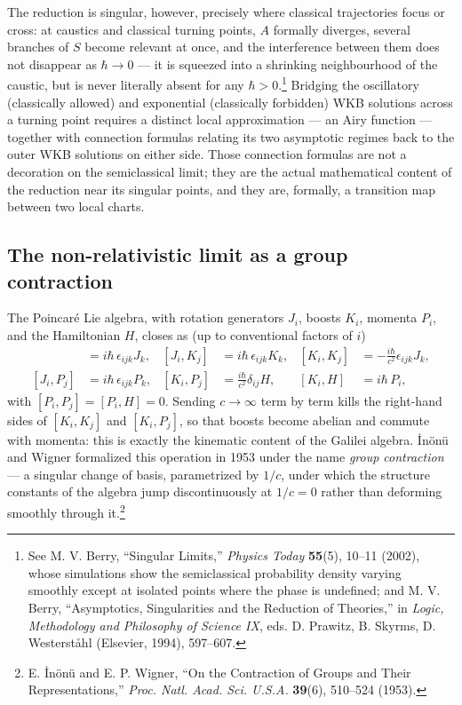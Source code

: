 The reduction is singular, however, precisely where classical trajectories
focus or cross: at caustics and classical turning points, $A$ formally
diverges, several branches of $S$ become relevant at once, and the interference
between them does not disappear as $\hbar\to 0$ --- it is squeezed into a
shrinking neighbourhood of the caustic, but is never literally absent for any
$\hbar>0$.\footnote{See M. V. Berry, ``Singular Limits,'' \emph{Physics Today}
\textbf{55}(5), 10--11 (2002), whose simulations show the semiclassical
probability density varying smoothly except at isolated points where the phase
is undefined; and M. V. Berry, ``Asymptotics, Singularities and the Reduction
of Theories,'' in \emph{Logic, Methodology and Philosophy of Science IX}, eds.
D. Prawitz, B. Skyrms, D. Westerst\aa hl (Elsevier, 1994), 597--607.} Bridging
the oscillatory (classically allowed) and exponential (classically forbidden)
WKB solutions across a turning point requires a distinct local approximation
--- an Airy function --- together with connection formulas relating its two
asymptotic regimes back to the outer WKB solutions on either side. Those
connection formulas are not a decoration on the semiclassical limit; they are
the actual mathematical content of the reduction near its singular points, and
they are, formally, a transition map between two local charts.

\subsection{The non-relativistic limit as a group contraction}
\label{sec:contraction}

The Poincar\'e Lie algebra, with rotation generators $J_i$, boosts $K_i$,
momenta $P_i$, and the Hamiltonian $H$, closes as (up to conventional factors
of $i$)
\begin{align}
[J_i,J_j] &= i\hbar\,\epsilon_{ijk}J_k, & [J_i,K_j] &= i\hbar\,\epsilon_{ijk}K_k, & [K_i,K_j] &= -\frac{i\hbar}{c^2}\epsilon_{ijk}J_k,\\
[J_i,P_j] &= i\hbar\,\epsilon_{ijk}P_k, & [K_i,P_j] &= \frac{i\hbar}{c^2}\delta_{ij}H, & [K_i,H] &= i\hbar\,P_i,
\end{align}
with $[P_i,P_j]=[P_i,H]=0$. Sending $c\to\infty$ term by term kills the
right-hand sides of $[K_i,K_j]$ and $[K_i,P_j]$, so that boosts become abelian
and commute with momenta: this is exactly the kinematic content of the Galilei
algebra. \.{I}n\"on\"u and Wigner formalized this operation in 1953 under the
name \emph{group contraction} --- a singular change of basis, parametrized by
$1/c$, under which the structure constants of the algebra jump discontinuously
at $1/c=0$ rather than deforming smoothly through it.\footnote{E. \.{I}n\"on\"u
and E. P. Wigner, ``On the Contraction of Groups and Their Representations,''
\emph{Proc. Natl. Acad. Sci. U.S.A.} \textbf{39}(6), 510--524 (1953).}

